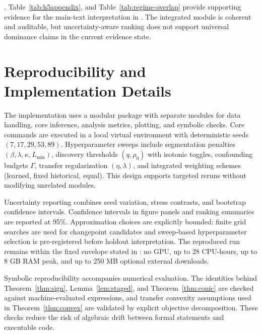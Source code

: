 \documentclass{article} %
\begin{document}
, Table~\ref{tab:h5appendix}, and Table~\ref{tab:regime-overlap} provide supporting evidence for the main-text interpretation in . The integrated module is coherent and auditable, but uncertainty-aware ranking does not support universal dominance claims in the current evidence state.

\section{Reproducibility and Implementation Details}\label{app:repro}
The implementation uses a modular package with separate modules for data handling, core inference, analysis metrics, plotting, and symbolic checks. Core commands are executed in a local virtual environment with deterministic seeds $(7,17,29,53,89)$. Hyperparameter sweeps include segmentation penalties $(\beta,\lambda,\kappa,L_{\min})$, discovery thresholds $(q,\rho_0)$ with isotonic toggles, confounding budgets $\Gamma$, transfer regularization $(\eta,\lambda)$, and integrated weighting schemes (learned, fixed historical, equal). This design supports targeted reruns without modifying unrelated modules.

Uncertainty reporting combines seed variation, stress contrasts, and bootstrap confidence intervals. Confidence intervals in figure panels and ranking summaries are reported at 95\%. Approximation choices are explicitly bounded: finite grid searches are used for changepoint candidates and sweep-based hyperparameter selection is pre-registered before holdout interpretation. The reproduced run remains within the fixed envelope stated in : no GPU, up to 28 CPU-hours, up to 8 GB RAM peak, and up to 250 MB optional external downloads.

Symbolic reproducibility accompanies numerical evaluation. The identities behind Theorem~\ref{thm:sign}, Lemma~\ref{lem:staged}, and Theorem~\ref{thm:conic} are checked against machine-evaluated expressions, and transfer convexity assumptions used in Theorem~\ref{thm:convex} are validated by explicit objective decomposition. These checks reduce the risk of algebraic drift between formal statements and executable code.
\end{document}
